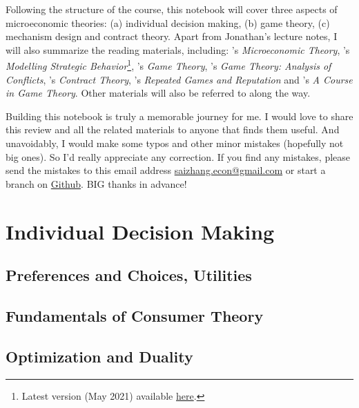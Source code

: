 \documentclass[12pt,openany]{report}
\theoremstyle{definition}
\begin{document}
Following the structure of the course, this notebook will cover three aspects of microeconomic theories: (a) individual decision making, (b) game theory, (c) mechanism design and contract theory. 
Apart from Jonathan's lecture notes, I will also summarize the reading materials, including: 
\cite{mas1995microeconomic}'s \textit{Microeconomic Theory}, \citet{mailath2018modeling}'s \textit{Modelling Strategic Behavior}\footnote{Latest version (May 2021) available \href{https://web.sas.upenn.edu/gmailath/books/modeling-strategic-behavior/}{here}.},
\cite{tirole1991game}'s \textit{Game Theory}, \cite{myerson1991game}'s \textit{Game Theory: Analysis of Conflicts}, \cite{bolton2005contract}'s \textit{Contract Theory}, 
\cite{Mailath2006repeated}'s \textit{Repeated Games and Reputation} and \cite{martin1994acourse}'s \textit{A Course in Game Theory}. Other materials will also be referred to along the way.


Building this notebook is truly a memorable journey for me. I would love to share this review and all the related
materials to anyone that finds them useful. And unavoidably, I would make some
typos and other minor mistakes (hopefully not big ones). So I'd really appreciate
any correction. If you find any mistakes, please send the mistakes to this email address \href{mailto:saizhang.econ@gmail.com}{saizhang.econ@gmail.com} or start a branch on \href{https://github.com/SaiChrisZHANG/MicroEconLearning}{Github}. BIG thanks in advance!

\newpage

\dominitoc
{}
\label{ToC-first-page}
\tableofcontents

\pagestyle{mystyle}
\part{Individual Decision Making}

\chapter{Preferences and Choices, Utilities}\label{chap1}


\chapter{Fundamentals of Consumer Theory}\label{chap2}


\chapter{Optimization and Duality}\label{chap3}
%
\end{document}
